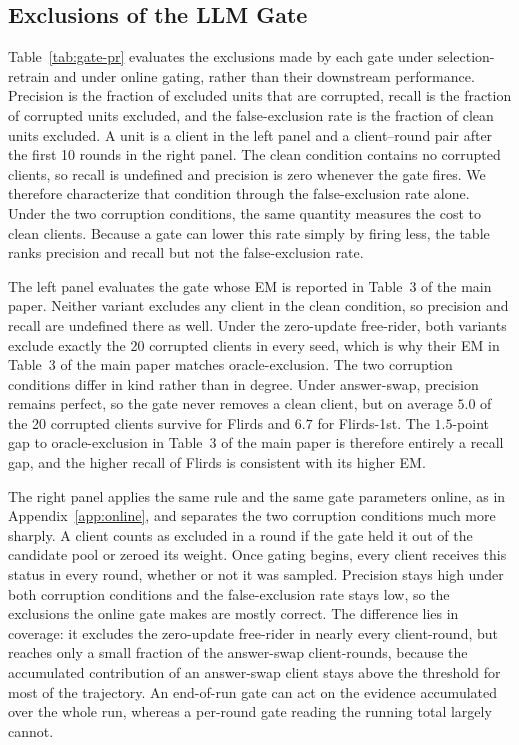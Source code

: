 \documentclass[letterpaper]{article} %
\theoremstyle{definition}
\begin{document}
\subsection{Exclusions of the LLM Gate}
\label{app:gate-sets}

Table~\ref{tab:gate-pr} evaluates the exclusions made by each gate under
selection-retrain and under online gating, rather than their downstream
performance. Precision is the fraction
of excluded units that are corrupted, recall is the fraction of corrupted
units excluded, and the false-exclusion rate is the fraction of clean units
excluded. A unit is a client in the left panel and a client--round pair after
the first 10 rounds in the right panel. The clean condition contains no corrupted clients,
so recall is undefined and precision is zero whenever the gate fires. We
therefore characterize that condition through the false-exclusion rate alone.
Under the two corruption conditions, the same quantity measures the cost to
clean clients. Because a gate can lower this rate simply by firing less, the
table ranks precision and recall but not the false-exclusion rate.

The left panel evaluates the gate whose EM is reported in
Table~3 of the main paper.
Neither variant excludes any client in the clean condition, so precision and
recall are undefined there as well. Under the zero-update free-rider, both
variants exclude exactly the 20 corrupted clients in every seed, which is why
their EM in Table~3 of the main paper matches oracle-exclusion. The two
corruption conditions
differ in kind rather than in degree. Under answer-swap, precision remains
perfect, so the gate never removes a clean client, but on average $5.0$ of the
20 corrupted clients survive for Flirds and $6.7$ for Flirds-1st. The
$1.5$-point gap to oracle-exclusion in
Table~3 of the main paper is
therefore entirely a recall gap, and the higher recall of Flirds is consistent
with its higher EM.

The right panel applies the same rule and the same gate parameters online, as
in Appendix~\ref{app:online}, and separates the two corruption
conditions much more sharply. A client counts as excluded in a round if the
gate held it out of the candidate pool or zeroed its weight. Once gating
begins, every client receives this status in every round, whether or not it was
sampled. Precision stays
high under both corruption conditions and the false-exclusion rate stays low,
so the exclusions the online gate makes are mostly correct. The difference
lies in coverage: it excludes the zero-update free-rider in nearly every
client-round, but reaches only a small fraction of
the answer-swap client-rounds, because the accumulated contribution of an
answer-swap client stays above the threshold for most of the trajectory. An
end-of-run gate can act on the evidence accumulated over the whole run,
whereas a per-round gate reading the running total largely cannot.
\end{document}
